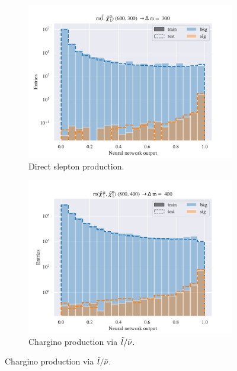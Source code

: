 \begin{figure}[H]
    \centering
    \begin{subfigure}[t!]{0.49\textwidth}
        \includegraphics[width = \textwidth]{Figures/SlepSlep/ML/NN/All_level/Inter/scaled_train_test_396014.pdf}
        \caption{Direct slepton production.}
        \label{fig:SlepslepNNLow}
    \end{subfigure}
    \begin{subfigure}[t!]{0.49\textwidth}
        \includegraphics[width = \textwidth]{Figures/SlepSnu/NN/All_level/Inter/scaled_train_test_397150.pdf}
        \caption{Chargino production via $\Tilde{l}/\Tilde{\nu}$.}
        \label{fig:SlepsnuNNLow}
    \end{subfigure}    

\end{figure}
